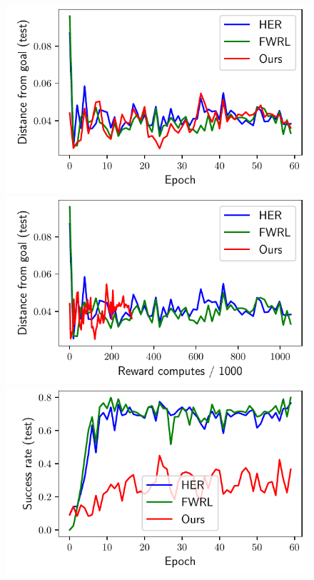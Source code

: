 \begin{figure}
  \def\frac{0.24}
  \includegraphics[width=\frac\columnwidth]{media/res/6efc1de-path_reward_low_thresh_chosen-HandReachPR-v0-dqst/epoch-test/ag_g_dist.pdf}%
  \includegraphics[width=\frac\columnwidth]{media/res/6efc1de-path_reward_low_thresh_chosen-HandReachPR-v0-dqst/reward_computes-test/ag_g_dist.pdf}%
  \includegraphics[width=\frac\columnwidth]{media/res/6efc1de-path_reward_low_thresh_chosen-HandReachPR-v0-dqst/epoch-test/success_rate.pdf}%

\end{figure}
